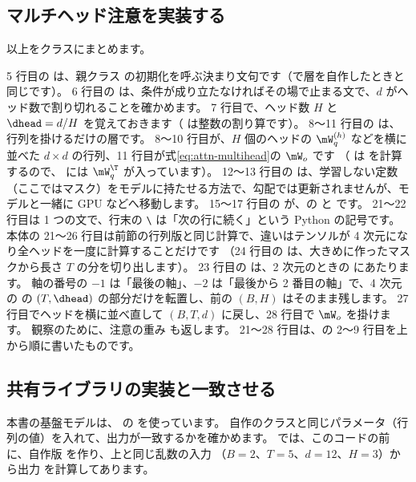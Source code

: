 \subsection*{マルチヘッド注意を実装する}

以上をクラスにまとめます。


5 行目の  は、親クラス  の初期化を呼ぶ決まり文句です（で層を自作したときと同じです）。
6 行目の  は、条件が成り立たなければその場で止まる文で、$d$ がヘッド数で割り切れることを確かめます。
7 行目で、ヘッド数 $H$ と $\dhead=d/H$ を覚えておきます（\code{//} は整数の割り算です）。
8〜11 行目の  は、行列を掛けるだけの層です。
8〜10 行目が、$H$ 個のヘッドの $\mW_q^{(h)}$ などを横に並べた $d\times d$ の行列、11 行目が式\eqref{eq:attn-multihead}の $\mW_o$ です
（ は  を計算するので、 には $\mW_q^\T$ が入っています）。
12〜13 行目の  は、学習しない定数（ここではマスク）をモデルに持たせる方法で、勾配では更新されませんが、モデルと一緒に GPU などへ移動します。
15〜17 行目の  が、の  と  です。
21〜22 行目は 1 つの文で、行末の \texttt{\textbackslash} は「次の行に続く」という Python の記号です。
本体の 21〜26 行目は前節の行列版と同じ計算で、違いはテンソルが 4 次元になり全ヘッドを一度に計算することだけです
（24 行目の  は、大きめに作ったマスクから長さ $T$ の分を切り出します）。
23 行目の  は、2 次元のときの  にあたります。
軸の番号の $-1$ は「最後の軸」、$-2$ は「最後から 2 番目の軸」で、4 次元の  の $(T,\dhead)$ の部分だけを転置し、前の $(B,H)$ はそのまま残します。
27 行目でヘッドを横に並べ直して $(B,T,d)$ に戻し、28 行目で $\mW_o$ を掛けます。
観察のために、注意の重み  も返します。
21〜28 行目は、の 2〜9 行目を上から順に書いたものです。

\subsection*{共有ライブラリの実装と一致させる}

本書の基盤モデルは、 の  を使っています。
自作のクラスと同じパラメータ（行列の値）を入れて、出力が一致するかを確かめます。
 では、このコードの前に、自作版  を作り、上と同じ乱数の入力 （$B=2$、$T=5$、$d=12$、$H=3$）から出力  を計算してあります。

